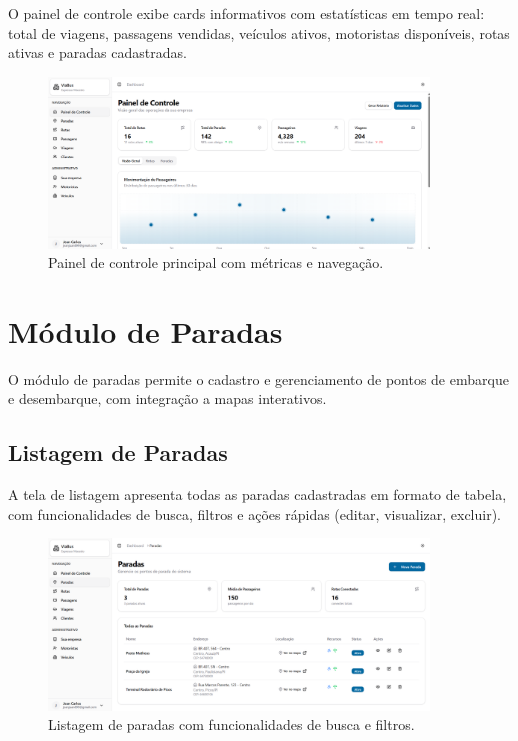 O painel de controle exibe cards informativos com estatísticas em tempo real: total de viagens, passagens vendidas, veículos ativos, motoristas disponíveis, rotas ativas e paradas cadastradas.

\begin{figure}[H]
  \centering
  \includegraphics[width=0.9\textwidth]{imagens/dashboard.png}
  \caption{Painel de controle principal com métricas e navegação.}
  \label{fig:dashboard}
\end{figure}

\section{Módulo de Paradas}

O módulo de paradas permite o cadastro e gerenciamento de pontos de embarque e desembarque, com integração a mapas interativos.

\subsection{Listagem de Paradas}

A tela de listagem apresenta todas as paradas cadastradas em formato de tabela, com funcionalidades de busca, filtros e ações rápidas (editar, visualizar, excluir).

\begin{figure}[H]
  \centering
  \includegraphics[width=0.9\textwidth]{imagens/listagem-paradas.png}
  \caption{Listagem de paradas com funcionalidades de busca e filtros.}
  \label{fig:listagem-paradas}
\end{figure}

